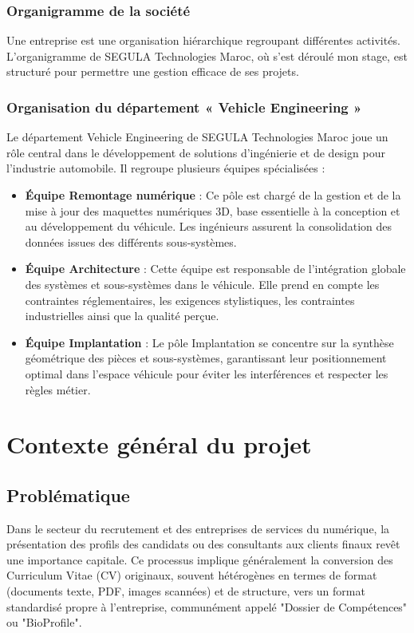 \subsubsection{Organigramme de la société}
Une entreprise est une organisation hiérarchique regroupant différentes activités. L'organigramme de SEGULA Technologies Maroc, où s'est déroulé mon stage, est structuré pour permettre une gestion efficace de ses projets.

\subsubsection{Organisation du département « Vehicle Engineering »}
Le département Vehicle Engineering de SEGULA Technologies Maroc joue un rôle central dans le développement de solutions d'ingénierie et de design pour l'industrie automobile. Il regroupe plusieurs équipes spécialisées :

\begin{itemize}
    \item \textbf{Équipe Remontage numérique} : Ce pôle est chargé de la gestion et de la mise à jour des maquettes numériques 3D, base essentielle à la conception et au développement du véhicule. Les ingénieurs assurent la consolidation des données issues des différents sous-systèmes.
    \item \textbf{Équipe Architecture} : Cette équipe est responsable de l'intégration globale des systèmes et sous-systèmes dans le véhicule. Elle prend en compte les contraintes réglementaires, les exigences stylistiques, les contraintes industrielles ainsi que la qualité perçue.
    \item \textbf{Équipe Implantation} : Le pôle Implantation se concentre sur la synthèse géométrique des pièces et sous-systèmes, garantissant leur positionnement optimal dans l'espace véhicule pour éviter les interférences et respecter les règles métier.
\end{itemize}

\section{Contexte général du projet}

\subsection{Problématique}
Dans le secteur du recrutement et des entreprises de services du numérique, la présentation des profils des candidats ou des consultants aux clients finaux revêt une importance capitale. Ce processus implique généralement la conversion des Curriculum Vitae (CV) originaux, souvent hétérogènes en termes de format (documents texte, PDF, images scannées) et de structure, vers un format standardisé propre à l'entreprise, communément appelé "Dossier de Compétences" ou "BioProfile".

